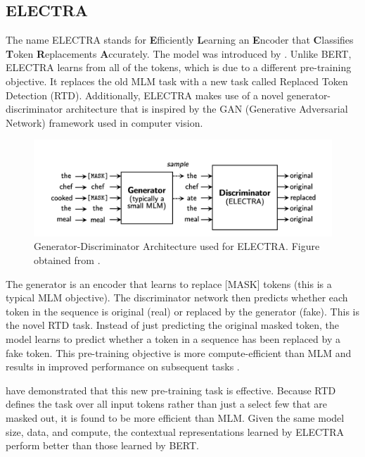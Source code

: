 \subsection{ELECTRA} \label{electra}

The name ELECTRA stands for \textbf{E}fficiently \textbf{L}earning an \textbf{E}ncoder that \textbf{C}lassifies \textbf{T}oken \textbf{R}eplacements \textbf{A}ccurately. The model was introduced by \citet{clark2020electra}. Unlike BERT, ELECTRA learns from all of the tokens, which is due to a different pre-training objective. It replaces the old MLM task with a new task called Replaced Token Detection (RTD). Additionally, ELECTRA makes use of a novel generator-discriminator architecture that is inspired by the GAN (Generative Adversarial Network) framework used in computer vision.

\begin{figure}[h!]
\centering
\includegraphics[width = 1\linewidth]{figures/electra.png}
\caption{Generator-Discriminator Architecture used for ELECTRA. Figure obtained from \citet{clark2020electra}.}
\label{fig:electra}
\end{figure}

The generator is an encoder that learns to replace [MASK] tokens (this is a typical MLM objective). The discriminator network then predicts whether each token in the sequence is original (real) or replaced by the generator (fake). This is the novel RTD task. Instead of just predicting the original masked token, the model learns to predict whether a token in a sequence has been replaced by a fake token. This pre-training objective is more compute-efficient than MLM and results in improved performance on subsequent tasks \citep{clark2020electra}.

\citet{clark2020electra} have demonstrated that this new pre-training task is effective. Because RTD defines the task over all input tokens rather than just a select few that are masked out, it is found to be more efficient than MLM. Given the same model size, data, and compute, the contextual representations learned by ELECTRA perform better than those learned by BERT.


